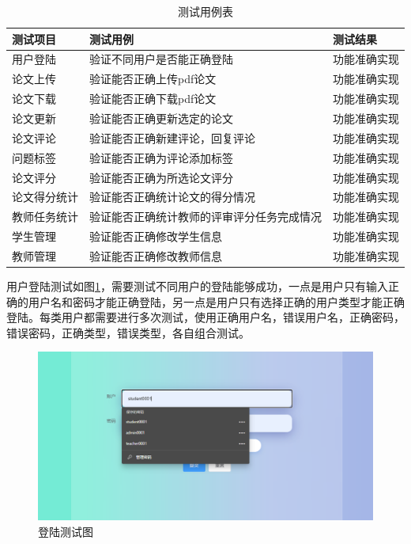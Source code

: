 \begin{table}[H]
  \centering
  \song\wuhao
  \caption{ 测试用例表 }
  \label{test-usecase-table}
  \begin{tabular}{|l|l|l|}
    \hline
    测试项目     & 测试用例                                   & 测试结果     \\ \hline
    用户登陆     & 验证不同用户是否能正确登陆                 & 功能准确实现 \\ \hline
    论文上传     & 验证能否正确上传pdf论文                    & 功能准确实现 \\ \hline
    论文下载     & 验证能否正确下载pdf论文                    & 功能准确实现 \\ \hline
    论文更新     & 验证能否正确更新选定的论文                 & 功能准确实现 \\ \hline
    论文评论     & 验证能否正确新建评论，回复评论             & 功能准确实现 \\ \hline
    问题标签     & 验证能否正确为评论添加标签                 & 功能准确实现 \\ \hline
    论文评分     & 验证能否正确为所选论文评分                 & 功能准确实现 \\ \hline
    论文得分统计 & 验证能否正确统计论文的得分情况             & 功能准确实现 \\ \hline
    教师任务统计 & 验证能否正确统计教师的评审评分任务完成情况 & 功能准确实现 \\ \hline
    学生管理     & 验证能否正确修改学生信息                   & 功能准确实现 \\ \hline
    教师管理     & 验证能否正确修改教师信息                   & 功能准确实现 \\ \hline
  \end{tabular}
\end{table}

用户登陆测试如图\ref{login-test}，需要测试不同用户的登陆能够成功，一点是用户只有输入正确的用户名和密码才能正确登陆，另一点是用户只有选择正确的用户类型才能正确登陆。每类用户都需要进行多次测试，使用正确用户名，错误用户名，正确密码，错误密码，正确类型，错误类型，各自组合测试。

\begin{figure}[H]
  \centering
  \includegraphics[scale = 0.57]{out/figure/测试/login-test.png}
  \caption{\song\wuhao 登陆测试图}
  \label{login-test}
\end{figure}

